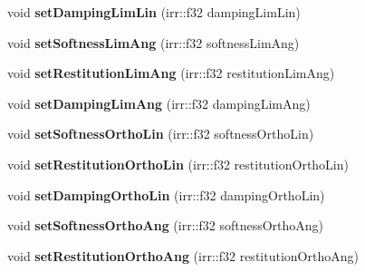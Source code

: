 \begin{DoxyCompactItemize}
\item 
\hypertarget{class_c_irr_b_p_slide_constraint_a97a82079ab5fa785bd412f93f40927b5}{
void {\bfseries setDampingLimLin} (irr::f32 dampingLimLin)}
\label{class_c_irr_b_p_slide_constraint_a97a82079ab5fa785bd412f93f40927b5}

\item 
\hypertarget{class_c_irr_b_p_slide_constraint_a63e2aa99061d8121218c8b304628d8f7}{
void {\bfseries setSoftnessLimAng} (irr::f32 softnessLimAng)}
\label{class_c_irr_b_p_slide_constraint_a63e2aa99061d8121218c8b304628d8f7}

\item 
\hypertarget{class_c_irr_b_p_slide_constraint_acea0e8abfa4295e95dd148b3a02a11e7}{
void {\bfseries setRestitutionLimAng} (irr::f32 restitutionLimAng)}
\label{class_c_irr_b_p_slide_constraint_acea0e8abfa4295e95dd148b3a02a11e7}

\item 
\hypertarget{class_c_irr_b_p_slide_constraint_ae83561e6ecbf6f3f19628de4b13b42e0}{
void {\bfseries setDampingLimAng} (irr::f32 dampingLimAng)}
\label{class_c_irr_b_p_slide_constraint_ae83561e6ecbf6f3f19628de4b13b42e0}

\item 
\hypertarget{class_c_irr_b_p_slide_constraint_a3c52720f6bbfd8a419b3e316cf176839}{
void {\bfseries setSoftnessOrthoLin} (irr::f32 softnessOrthoLin)}
\label{class_c_irr_b_p_slide_constraint_a3c52720f6bbfd8a419b3e316cf176839}

\item 
\hypertarget{class_c_irr_b_p_slide_constraint_a26f84b0323c7107bb99ebdc4ce1193fd}{
void {\bfseries setRestitutionOrthoLin} (irr::f32 restitutionOrthoLin)}
\label{class_c_irr_b_p_slide_constraint_a26f84b0323c7107bb99ebdc4ce1193fd}

\item 
\hypertarget{class_c_irr_b_p_slide_constraint_a9f7c4cc5ab4076e0539575d4c66bf384}{
void {\bfseries setDampingOrthoLin} (irr::f32 dampingOrthoLin)}
\label{class_c_irr_b_p_slide_constraint_a9f7c4cc5ab4076e0539575d4c66bf384}

\item 
\hypertarget{class_c_irr_b_p_slide_constraint_a1847f06bc037af050a887e9c139e0681}{
void {\bfseries setSoftnessOrthoAng} (irr::f32 softnessOrthoAng)}
\label{class_c_irr_b_p_slide_constraint_a1847f06bc037af050a887e9c139e0681}

\item 
\hypertarget{class_c_irr_b_p_slide_constraint_ae244cad578807d16899cfc4e1b92a3df}{
void {\bfseries setRestitutionOrthoAng} (irr::f32 restitutionOrthoAng)}
\label{class_c_irr_b_p_slide_constraint_ae244cad578807d16899cfc4e1b92a3df}


\end{DoxyCompactItemize}

